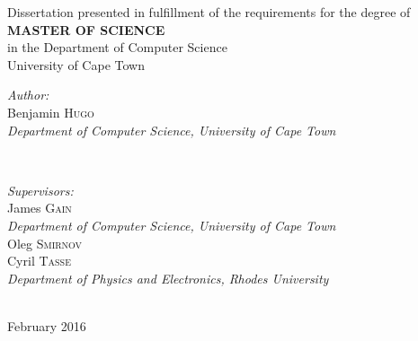 \begin{titlepage}
\begin{center}
 {\large Dissertation presented in fulfillment of the requirements for the degree of} \\
 {\large \textbf{MASTER OF SCIENCE}} \\
 {\large in the Department of Computer Science} \\
 {\large University of Cape Town}
\end{center}
\vspace{0.15\textheight}
\begin{minipage}{0.4\textwidth}
\begin{flushleft} \large
\emph{Author:} \\
Benjamin \textsc{Hugo} \\
{\small \textit{Department of Computer Science, University of Cape Town}}\\
\end{flushleft}
\end{minipage}
~
\begin{minipage}{0.4\textwidth}
\begin{flushright} \large
\emph{Supervisors:} \\
James \textsc{Gain} \\
{\small \textit{Department of Computer Science, University of Cape Town}}\\
Oleg \textsc{Smirnov} \\
Cyril \textsc{Tasse} \\
{\small \textit{Department of Physics and Electronics, Rhodes University}}
\end{flushright}
\end{minipage}\\[3cm]


{\large February 2016}\\[1.5cm] %

\vfill %

\end{titlepage}

